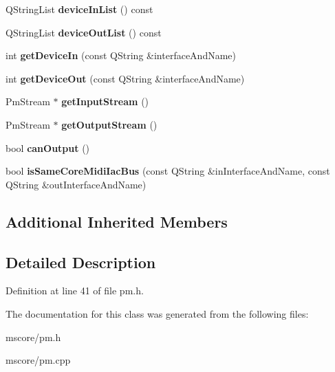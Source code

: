 \begin{DoxyCompactItemize}
Q\+String\+List {\bfseries device\+In\+List} () const
\item 
\mbox{\label{class_ms_1_1_port_midi_driver_a2357a2afd78c572ff551e64286567875}} 
Q\+String\+List {\bfseries device\+Out\+List} () const
\item 
\mbox{\label{class_ms_1_1_port_midi_driver_afd02f16b1ec1ee4a25d36a4d0c47742a}} 
int {\bfseries get\+Device\+In} (const Q\+String \&interface\+And\+Name)
\item 
\mbox{\label{class_ms_1_1_port_midi_driver_a1bb60ba3870aaad999539b5b9844c14b}} 
int {\bfseries get\+Device\+Out} (const Q\+String \&interface\+And\+Name)
\item 
\mbox{\label{class_ms_1_1_port_midi_driver_a0c00912c9f18b68631722a9f4d2773d7}} 
Pm\+Stream $\ast$ {\bfseries get\+Input\+Stream} ()
\item 
\mbox{\label{class_ms_1_1_port_midi_driver_a9acb9d41dd0cbbfce91e7f782d14418c}} 
Pm\+Stream $\ast$ {\bfseries get\+Output\+Stream} ()
\item 
\mbox{\label{class_ms_1_1_port_midi_driver_a23b89ac023700b87980f0ccd524805b1}} 
bool {\bfseries can\+Output} ()
\item 
\mbox{\label{class_ms_1_1_port_midi_driver_accce1e558edf84b36e57677fcbb59656}} 
bool {\bfseries is\+Same\+Core\+Midi\+Iac\+Bus} (const Q\+String \&in\+Interface\+And\+Name, const Q\+String \&out\+Interface\+And\+Name)
\end{DoxyCompactItemize}
\subsection*{Additional Inherited Members}


\subsection{Detailed Description}


Definition at line 41 of file pm.\+h.



The documentation for this class was generated from the following files\+:\begin{DoxyCompactItemize}
\item 
mscore/pm.\+h\item 
mscore/pm.\+cpp\end{DoxyCompactItemize}
